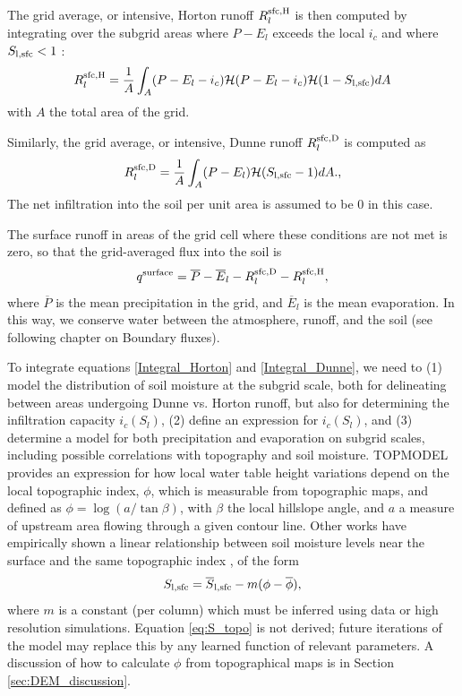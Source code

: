 \documentclass[twoside,10pt]{report}
\begin{document}
The grid average, or intensive, Horton runoff $R_l^{\rm sfc, H}$ is then computed by integrating over the subgrid areas where $P-E_l$ exceeds the local $i_c$ and where $S_{\rm l, sfc} <1$ \citep{Entekhabi89}:
 \begin{equation}
    R_l^{\rm sfc, H} =  \frac{1}{A}\int_{A} (P-E_l-i_c) \mathcal{H}(P-E_l-i_c) \mathcal{H}(1-S_{\rm l,sfc}) dA
    \label{Integral_Horton}
\end{equation}
with $A$ the total area of the grid. 

Similarly, the grid average, or intensive, Dunne runoff $R_l^{\rm sfc, D}$ is computed as
 \begin{equation}
    R_l^{\rm sfc, D} =  \frac{1}{A}\int_{A} (P-E_l)\mathcal{H}(S_{\rm l,sfc}-1) dA.,
    \label{Integral_Dunne}
\end{equation}
The net infiltration into the soil per unit area is assumed to be 0 in this case.

The surface runoff in areas of the grid cell where these conditions are not met is zero, so that the grid-averaged flux into the soil is
 \begin{equation}
    q^{\rm surface} =  \overline{P}-\overline{E}_l - R_l^{\rm sfc, D} - R_l^{\rm sfc, H},
    \label{flux_total}
\end{equation}
where $\overline{P}$ is the mean precipitation in the grid, and $\overline{E}_l$ is the mean evaporation. In this way, we conserve water between the atmosphere, runoff, and the soil (see following chapter on Boundary fluxes). 

To integrate equations \eqref{Integral_Horton} and \eqref{Integral_Dunne}, we need to (1) model the distribution of soil moisture at the subgrid scale, both for delineating between areas undergoing Dunne vs. Horton runoff, but also for determining the infiltration capacity $i_c(S_l)$, (2) define an expression for $i_c(S_l)$, and (3) determine a model for both precipitation and evaporation on subgrid scales, including possible correlations with topography and soil moisture. TOPMODEL provides an expression for how local water table height variations depend on the local topographic index, $\phi$, which is measurable from topographic maps, and defined as $\phi = \log{(a/\tan{\beta})}$, with $\beta$ the local hillslope angle, and $a$ a measure of upstream area flowing through a given contour line. Other works have empirically shown a linear relationship between soil moisture levels near the surface and the same topographic index \citep{Sorensen06}, of the form
 \begin{equation}\label{eq:S_topo}
   S_{\rm l, sfc} = \overline{S}_{ \rm l, sfc} - m (\phi - \overline{\phi}),
\end{equation}
where $m$ is a constant (per column) which must be inferred using data or high resolution simulations. Equation \eqref{eq:S_topo} is not derived; future iterations of the model may replace this by any learned function of relevant parameters. A discussion of how to calculate $\phi$ from topographical maps is in Section \ref{sec:DEM_discussion}.  
\end{document}

